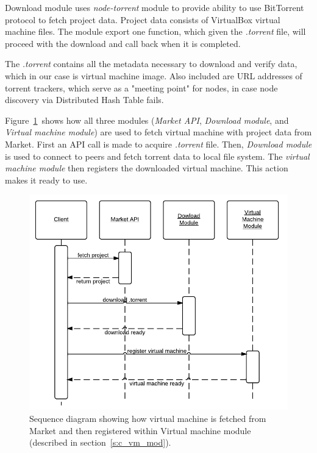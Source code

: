 Download module uses \emph{node-torrent} module to provide ability to use BitTorrent protocol to fetch project data. Project data consists of VirtualBox virtual machine files. The module export one function, which given the \emph{.torrent} file, will proceed with the download and call back when it is completed.

The \emph{.torrent} contains all the metadata necessary to download and verify data, which in our case is virtual machine image. Also included are URL addresses of torrent trackers, which serve as a "meeting point" for nodes, in case node discovery via Distributed Hash Table fails.

Figure~\ref{f:clientprojdownload}~shows how all three modules (\emph{Market API}, \emph{Download module}, and \emph{Virtual machine module}) are used to fetch virtual machine with project data from Market. First an API call is made to acquire \emph{.torrent} file. Then, \emph{Download module} is used to connect to peers and fetch torrent data to local file system. The \emph{virtual machine module} then registers the downloaded virtual machine. This action makes it ready to use.

\begin{figure}
\centering
\includegraphics{diagrams/ClientProjectDownload.pdf}
\caption{Sequence diagram showing how virtual machine is fetched from Market and then registered within Virtual machine module (described in section~\ref{s:c_vm_mod}).}
\label{f:clientprojdownload}
\end{figure}

